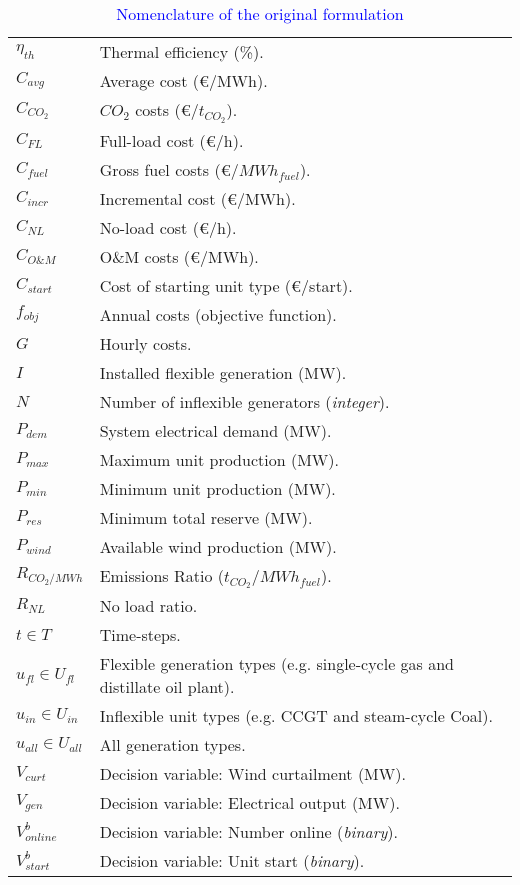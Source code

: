 \documentclass{article}
\begin{document}
\begin{table}[h]
    \caption{\textcolor{blue}{Nomenclature of the original formulation}}
    \label{tab:mip_nomenclature-1}
    \centering
    \begin{tabular}{ l l }
        $\eta_{th}$  & Thermal efficiency (\%). \\
        $C_{avg}$    & Average cost (\euro/MWh). \\
        $C_{CO_2}$   & $CO_2$ costs (\euro/$t_{CO_2}$). \\
        $C_{FL}$     & Full-load cost (\euro/h). \\
        $C_{fuel}$   & Gross fuel costs (\euro/$MWh_{fuel}$). \\
        $C_{incr}$   & Incremental cost (\euro/MWh). \\
        $C_{NL}$     & No-load cost (\euro/h). \\
        $C_{O\&M}$   & O\&M costs (\euro/MWh). \\
        $C_{start}$  & Cost of starting unit type (\euro/start). \\
        $f_{obj}$    & Annual costs (objective function). \\
        $G$          & Hourly costs. \\
        $I$          & Installed flexible generation (MW). \\
        $N$          & Number of inflexible generators (\textit{integer}). \\
        $P_{dem}$    & System electrical demand (MW). \\
        $P_{max}$    & Maximum unit production (MW). \\
        $P_{min}$       & Minimum unit production (MW). \\
        $P_{res}$       & Minimum total reserve (MW). \\
        $P_{wind}$      & Available wind production (MW). \\
        $R_{CO_2/MWh}$  & Emissions Ratio ($t_{CO_2}$/$MWh_{fuel}$). \\
        $R_{NL}$        & No load ratio. \\
        $t \in T$       & Time-steps. \\
        $u_{fl} \in U_{fl}$     & Flexible generation types (e.g. single-cycle gas and distillate oil plant). \\
        $u_{in} \in U_{in}$     & Inflexible unit types (e.g. CCGT and steam-cycle Coal). \\
        $u_{all} \in U_{all}$   & All generation types. \\
        $V_{curt}$              & Decision variable: Wind curtailment (MW). \\
        $V_{gen}$              & Decision variable: Electrical output (MW). \\
        $V_{online}^b$              & Decision variable: Number online (\textit{binary}). \\
        $V_{start}^b$              & Decision variable: Unit start (\textit{binary}). \\
    \end{tabular}
\end{table}
\end{document}
